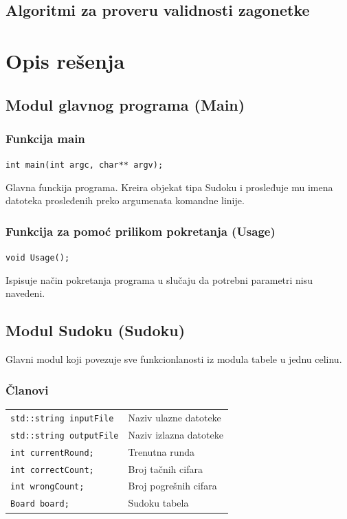 \documentclass[a4paper]{article}
\begin{document}
    \subsection{Algoritmi za proveru validnosti zagonetke}


    \newpage
    \section{Opis rešenja}
    
    \subsection{Modul glavnog programa (Main)}
    \subsubsection{Funkcija main}
    \texttt{int main(int argc, char** argv);}
    \par Glavna funckija programa. Kreira objekat tipa Sudoku i prosleđuje mu imena datoteka prosleđenih preko argumenata komandne linije.
    \subsubsection{Funkcija za pomoć prilikom pokretanja (Usage)}
    \texttt{void Usage();}
    \par Ispisuje način pokretanja programa u slučaju da potrebni parametri nisu navedeni.

    \subsection{Modul Sudoku (Sudoku)}
    Glavni modul koji povezuje sve funkcionlanosti iz modula tabele u jednu celinu.
    \subsubsection{Članovi}
    \begin{tabular}{ l l }
        \texttt{std::string inputFile} & Naziv ulazne datoteke\\
        \texttt{std::string outputFile} & Naziv izlazna datoteke\\
        \texttt{int currentRound;} & Trenutna runda\\
        \texttt{int correctCount;} & Broj tačnih cifara\\
        \texttt{int wrongCount;} & Broj pogrešnih cifara\\
        \texttt{Board board;} & Sudoku tabela\\
    \end{tabular}
    
\end{document}
